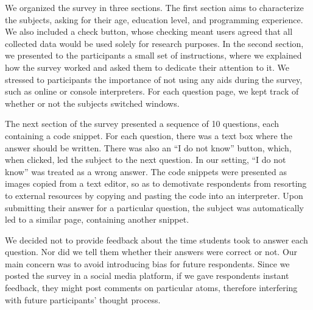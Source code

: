 We organized the survey in {\color{red}three} sections. The first section aims to characterize the subjects, asking for their age, education level, and programming experience. We also included a check button, whose checking meant users agreed that all collected data would be used solely for research purposes. In the second section, we presented to the participants a small set of instructions, where we explained how the survey worked and asked them to dedicate their attention to it. We stressed to participants the importance of not using any aids during the survey, such as online or console interpreters. For each question page, we kept track of whether or not the subjects switched windows. 

The next section of the survey presented a sequence of 10 questions, each containing a code snippet. For each question, there was a text box where the answer should be written. There was also an ``I do not know'' button, which, when clicked, led the subject to the next question. In our setting, ``I do not know'' was treated as a wrong answer. The code snippets were presented as images copied from a text editor, so as to demotivate respondents from resorting to external resources by copying and pasting the code into an interpreter. Upon submitting their answer for a particular question, the subject was automatically led to a similar page, containing another snippet.
    
We decided not to provide feedback about the time students took to answer each question. Nor did we tell them whether their answers were correct or not. Our main concern was to avoid introducing bias for future respondents. Since we posted the survey in a social media platform, if we gave respondents instant feedback, they might post comments on particular atoms, therefore interfering with future participants' thought process.



